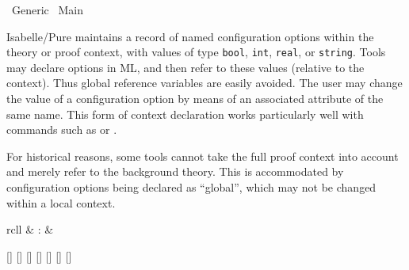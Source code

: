 %
\begin{isabellebody}%
\def\isabellecontext{Generic}%
%
\isadelimtheory
%
\endisadelimtheory
%
\isatagtheory
{}\isamarkupfalse%
\ Generic\isanewline
{}\ Main\isanewline
{}%
\endisatagtheory
{\isafoldtheory}%
%
\isadelimtheory
%
\endisadelimtheory
%
\isamarkuptrue%
%
\isamarkuptrue%
%
\begin{isamarkuptext}%
Isabelle/Pure maintains a record of named configuration
  options within the theory or proof context, with values of type
  \verb|bool|, \verb|int|, \verb|real|, or \verb|string|.  Tools may declare options in ML, and then refer to these
  values (relative to the context).  Thus global reference variables
  are easily avoided.  The user may change the value of a
  configuration option by means of an associated attribute of the same
  name.  This form of context declaration works particularly well with
  commands such as \hyperlink{command.declare}{\mbox{}} or \hyperlink{command.using}{\mbox{}}.

  For historical reasons, some tools cannot take the full proof
  context into account and merely refer to the background theory.
  This is accommodated by configuration options being declared as
  ``global'', which may not be changed within a local context.

  \begin{matharray}{rcll}
    \hypertarget{command.print-configs}{\hyperlink{command.print-configs}{\mbox{}}} & : &  \\
  \end{matharray}

  \begin{railoutput}
[]
\rail@bar
{}
[]
\rail@bar
{}[]
[]
[]
[]
[]
\rail@endbar
\rail@endbar
\rail@end
\end{railoutput}



\end{isamarkuptext}
\end{isabellebody}
